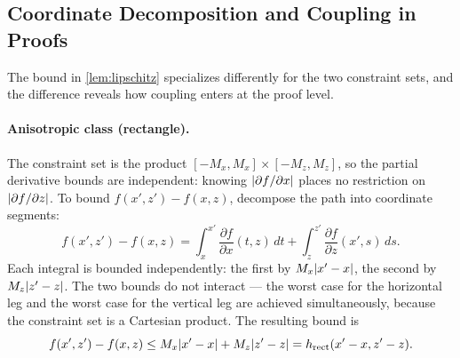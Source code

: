 \subsection{Coordinate Decomposition and Coupling in Proofs}\label{sec:technical:decomposition}

The bound in \cref{lem:lipschitz} specializes differently for the two constraint sets, and the difference reveals how coupling enters at the proof level.

\paragraph{Anisotropic class (rectangle).}
The constraint set is the product $[-M_x, M_x] \times [-M_z, M_z]$, so the partial derivative bounds are independent: knowing $\lvert\partial f / \partial x\rvert$ places no restriction on $\lvert\partial f / \partial z\rvert$.
To bound $f(x', z') - f(x, z)$, decompose the path into coordinate segments:
\begin{equation}\label{eq:ftc_aniso}
	f(x', z') - f(x, z) = \int_x^{x'} \frac{\partial f}{\partial x}(t, z)\, dt + \int_z^{z'} \frac{\partial f}{\partial z}(x', s)\, ds.
\end{equation}
Each integral is bounded independently: the first by $M_x\lvert x' - x\rvert$, the second by $M_z\lvert z' - z\rvert$.
The two bounds do not interact --- the worst case for the horizontal leg and the worst case for the vertical leg are achieved simultaneously, because the constraint set is a Cartesian product.
The resulting bound is
\begin{equation*}
	f(x', z') - f(x, z) \leq M_x\lvert x' - x\rvert + M_z\lvert z' - z\rvert = h_{\mathrm{rect}}(x' - x, z' - z).
\end{equation*}


